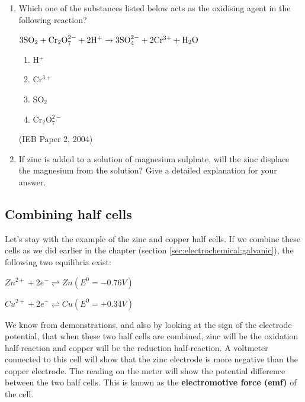 {\begin{enumerate}
{	\begin{enumerate}
	\item{Which substance is the strongest oxidising agent?}
	\item{Which substance is the strongest reducing agent?}
	\end{enumerate}}

\item{Which one of the substances listed below acts as the oxidising agent in the following reaction?
\begin{center}
$\rm{3SO_{2} + Cr_{2}O_{7}^{2-} + 2H^{+} \rightarrow 3SO_{4}^{2-} + 2Cr^{3+} + H_{2}O}$
\end{center}
	\begin{enumerate}
	\item{H$^{+}$}
	\item{Cr$^{3+}$}
	\item{SO$_{2}$}
	\item{Cr$_{2}$O$_{7}^{2-}$}
	\end{enumerate}
(IEB Paper 2, 2004)
}
\item{If zinc is added to a solution of magnesium sulphate, will the zinc displace the magnesium from the solution? Give a detailed explanation for your answer.}
\end{enumerate}



} %


\subsection{Combining half cells}
\label{subsec:electrochemical:combining half cells}

Let's stay with the example of the zinc and copper half cells. If we combine these cells as we did earlier in the chapter (section \ref{sec:electrochemical:galvanic}), the following two equilibria exist:

\begin{center}
\rm${Zn^{2+} + 2e^{-} \rightleftharpoons Zn (E^{0} = -0.76V)}$

\rm${Cu^{2+} + 2e^{-} \rightleftharpoons Cu (E^{0} = +0.34V)}$
\end{center}

We know from demonstrations, and also by looking at the sign of the electrode potential, that when these two half cells are combined, zinc will be the oxidation half-reaction and copper will be the reduction half-reaction. A voltmeter connected to this cell will show that the zinc electrode is more negative than the copper electrode. The reading on the meter will show the potential difference between the two half cells. This is known as the \textbf{electromotive force (emf)} of the cell.


